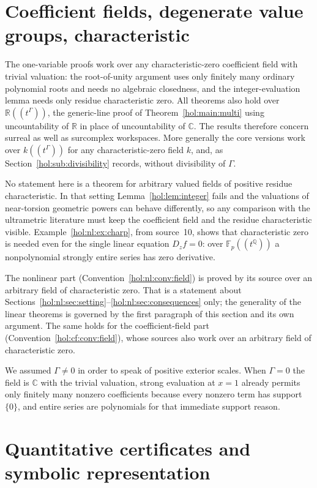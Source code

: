 \documentclass[11pt]{article}
\numberwithin{equation}{section}
\theoremstyle{definition}
\theoremstyle{remark}
\newcommand{\C}{\mathbb C}
\newcommand{\R}{\mathbb R}
\newcommand{\Q}{\mathbb Q}
\begin{document}
\section{Coefficient fields, degenerate value groups, characteristic}
\label{hol:sec:fields}

The one-variable proofs work over any characteristic-zero coefficient field
with trivial valuation: the root-of-unity argument uses only finitely many
ordinary polynomial roots and needs no algebraic closedness, and the
integer-evaluation lemma needs only residue characteristic zero. All theorems
also hold over $\R((t^\Gamma))$, the generic-line proof of
Theorem~\ref{hol:main:multi} using uncountability of $\R$ in place of
uncountability of $\C$. The results therefore concern surreal as well as
surcomplex workspaces. More generally the core versions work over
$k((t^\Gamma))$ for any characteristic-zero field $k$, and, as
Section~\ref{hol:sub:divisibility} records, without divisibility of $\Gamma$.

No statement here is a theorem for arbitrary valued fields of positive residue
characteristic. In that setting Lemma~\ref{hol:lem:integer} fails and the
valuations of near-torsion geometric powers can behave differently, so any
comparison with the ultrametric literature must keep the coefficient field and
the residue characteristic visible. Example~\ref{hol:nl:ex:charp}, from
source~10, shows that characteristic zero is needed even for the single
linear equation $D_zf=0$: over $\mathbb F_p((t^\Q))$ a nonpolynomial strongly
entire series has zero derivative.

The nonlinear part (Convention~\ref{hol:nl:conv:field}) is proved by its
source over an arbitrary field of characteristic zero. That is a statement
about Sections~\ref{hol:nl:sec:setting}--\ref{hol:nl:sec:consequences} only;
the generality of the linear theorems is governed by the first paragraph of
this section and its own argument. The same holds for the coefficient-field
part (Convention~\ref{hol:cf:conv:field}), whose sources also work over an
arbitrary field of characteristic zero.

We assumed $\Gamma\ne0$ in order to speak of positive exterior scales. When
$\Gamma=0$ the field is $\C$ with the trivial valuation, strong evaluation at
$x=1$ already permits only finitely many nonzero coefficients because every
nonzero term has support $\{0\}$, and entire series are polynomials for that
immediate support reason.

\section{Quantitative certificates and symbolic representation}
\label{hol:sec:certificates}
\end{document}

